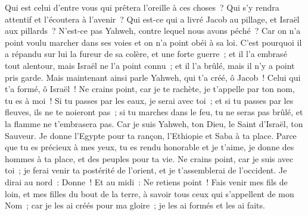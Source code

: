 \begin{multicols}{2}
Qui est celui d'entre vous qui prêtera l'oreille à ces choses~? Qui s'y rendra attentif et l'écoutera à l'avenir~?
Qui est-ce qui a livré Jacob au pillage, et Israël aux pillards~? N'est-ce pas Yahweh, contre lequel nous avons péché~? Car on n'a point voulu marcher dans ses voies et on n'a point obéi à sa loi.
C'est pourquoi il a répandu sur lui la fureur de sa colère, et une forte guerre~; et il l'a embrasé tout alentour, mais Israël ne l'a point connu~; et il l'a brûlé, mais il n'y a point pris garde.
\VerseOne{}Mais maintenant ainsi parle Yahweh, qui t'a créé, ô Jacob~! Celui qui t'a formé, ô Israël~! Ne crains point, car je te rachète, je t'appelle par ton nom, tu es à moi~!
Si tu passes par les eaux, je serai avec toi~; et si tu passes par les fleuves, ils ne te noieront pas~; si tu marches dans le feu, tu ne seras pas brûlé, et la flamme ne t'embrasera pas.
Car je suis Yahweh, ton Dieu, le Saint d'Israël, ton Sauveur. Je donne l'Egypte pour ta rançon, l'Ethiopie et Saba à ta place.
Parce que tu es précieux à mes yeux, tu es rendu honorable et je t'aime, je donne des hommes à ta place, et des peuples pour ta vie.
Ne crains point, car je suis avec toi~; je ferai venir ta postérité de l'orient, et je t'assemblerai de l'occident.
Je dirai au nord~: Donne~! Et au midi~: Ne retiens point~! Fais venir mes fils de loin, et mes filles du bout de la terre,
à savoir tous ceux qui s'appellent de mon Nom~; car je les ai créés pour ma gloire~; je les ai formés et les ai faits.

\end{multicols}
